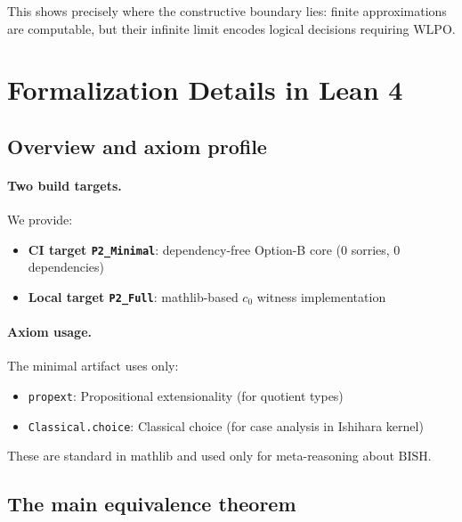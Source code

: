 \documentclass[11pt]{article}  %
\newcommand{\WLPO}{\mathrm{WLPO}}
\newcommand{\BISH}{\mathrm{BISH}}
\begin{document}
This shows precisely where the constructive boundary lies: finite approximations are computable, but their infinite limit encodes logical decisions requiring $\WLPO$.

\section{Formalization Details in Lean 4}\label{sec:lean}

\subsection{Overview and axiom profile}

\paragraph{Two build targets.}
We provide:
\begin{itemize}
\item \textbf{CI target \texttt{P2\_Minimal}}: dependency-free Option-B core (0 sorries, 0 dependencies)
\item \textbf{Local target \texttt{P2\_Full}}: mathlib-based $c_0$ witness implementation
\end{itemize}

\paragraph{Axiom usage.}
The minimal artifact uses only:
\begin{itemize}
\item \texttt{propext}: Propositional extensionality (for quotient types)
\item \texttt{Classical.choice}: Classical choice (for case analysis in Ishihara kernel)
\end{itemize}
These are standard in mathlib and used only for meta-reasoning about $\BISH$.

\subsection{The main equivalence theorem}
\end{document}
